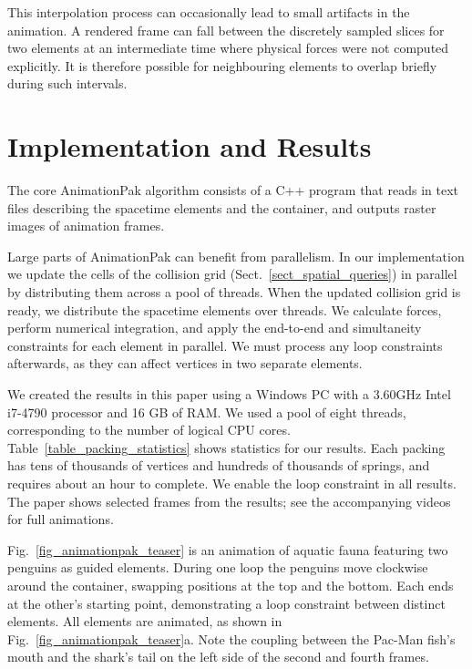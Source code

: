 This interpolation process can occasionally lead to small artifacts in 
the animation.  A rendered frame can fall between
the discretely sampled slices for two elements at an intermediate time
where physical forces were not computed explicitly.  It is therefore
possible for neighbouring elements to overlap briefly during such intervals.


\section{Implementation and Results}
\label{animationpak_implementation_and_results}

The core AnimationPak algorithm consists of a C++ program that reads 
in text files describing the spacetime elements and the container, 
and outputs raster images of animation frames.

Large parts of AnimationPak can benefit from parallelism.  In
our implementation we update the cells of the collision grid
(Sect.~\ref{sect_spatial_queries}) in parallel by distributing them
across a pool of threads.  When the updated collision grid is ready,
we distribute the spacetime elements over threads.  We calculate
forces, perform numerical integration, and apply the end-to-end and
simultaneity constraints for each element in parallel.  We must
process any loop constraints afterwards, as they can affect vertices in
two separate elements.

We created the results in this paper using a Windows PC with a 
3.60GHz Intel i7-4790 processor and 16 GB of RAM.  We used a pool
of eight threads, corresponding to the number of logical CPU cores.
Table~\ref{table_packing_statistics} shows statistics for our results.
Each packing has tens of thousands of vertices and hundreds of thousands
of springs, and requires about an hour to complete.
We enable the loop constraint in all results.  The paper shows selected frames from the
results; see the accompanying videos for full animations.

Fig.~\ref{fig_animationpak_teaser} is an animation of aquatic fauna featuring two
penguins as guided elements.  During one loop the penguins move clockwise
around the container, swapping positions at the top and the bottom.
Each ends at the other's starting point, demonstrating a loop constraint
between distinct elements.  All elements are animated, as shown in 
Fig.~\ref{fig_animationpak_teaser}a.  Note the coupling between the Pac-Man fish's
mouth and the shark's tail on the left side of the second and fourth frames.

